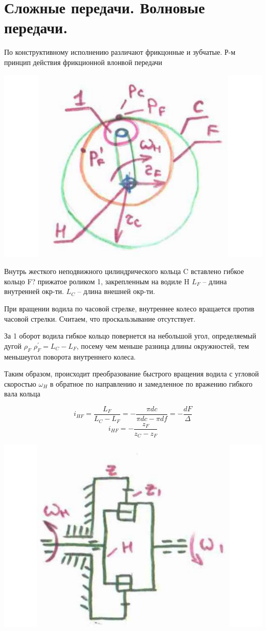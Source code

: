 \documentclass{article}
\begin{document}
\section{Сложные передачи. Волновые передачи.}

По конструктивному исполнению различают фрикцонные и зубчатые. Р-м принцип действия фрикционной влонвой передачи

\includegraphics[width = \textwidth]{1}

Внутрь жесткого неподвижного цилиндрического кольца C вставлено гибкое кольцо F? прижатое роликом 1, закрепленным на водиле H
$L_F$ -- длина внутренней окр-ти.
$L_C$ -- длина внешней окр-ти.

При вращении водила по часовой стрелке, внутреннее колесо вращается против часовой стрелки. Считаем, что проскальзывание отсутствует.

За 1 оборот водила гибкое кольцо повернется на небольшой угол, определяемый дугой $\rho_F$ $\rho_F^{'} = L_C - L_F$, посему чем меньше разница длины окружностей, тем меньшеугол поворота внутреннего колеса.

Таким образом, происходит преобразование быстрого вращения водила с угловой скоростью $\omega_H$ в обратное по направлению и замедленное по вражению гибкого вала кольца

$$
i_{HF} = \frac{L_F}{L_C - L_F}  = - \frac{\pi dc}{\pi dc - \pi df} = - \frac{dF}{ \Delta} 
$$
$$
i_{HF} = - \frac{z_F}{z_C - z_F} 
$$

\includegraphics[width = \textwidth]{2}
\end{document}
